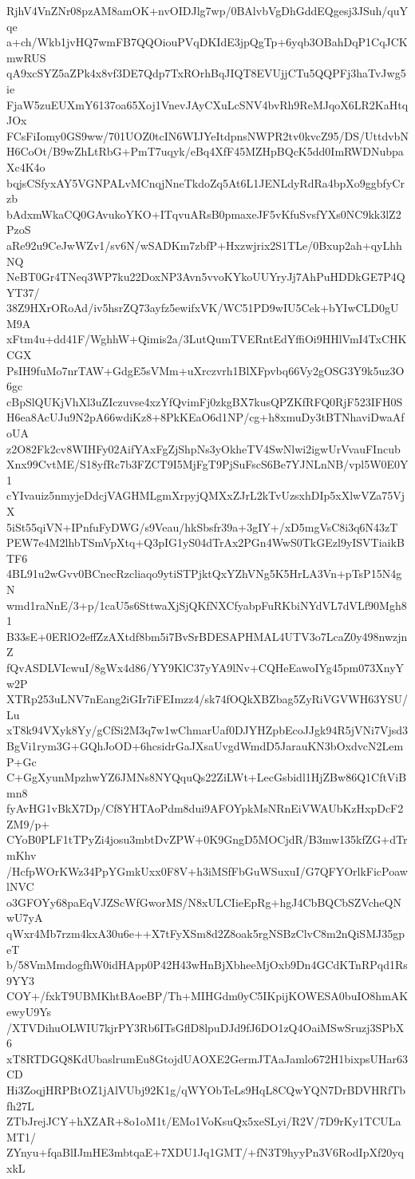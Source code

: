 RjhV4VnZNr08pzAM8amOK+nvOIDJlg7wp/0BAlvbVgDhGddEQgesj3JSuh/quYqe
a+ch/Wkb1jvHQ7wmFB7QQOiouPVqDKIdE3jpQgTp+6yqb3OBahDqP1CqJCKmwRUS
qA9xcSYZ5aZPk4x8vf3DE7Qdp7TxROrhBqJIQT8EVUjjCTu5QQPFj3haTvJwg5ie
FjaW5zuEUXmY6137oa65Xoj1VnevJAyCXuLcSNV4bvRh9ReMJqoX6LR2KaHtqJOx
FCsFiIomy0GS9ww/701UOZ0tcIN6WIJYeItdpnsNWPR2tv0kvcZ95/DS/UttdvbN
H6CoOt/B9wZhLtRbG+PmT7uqyk/eBq4XfF45MZHpBQcK5dd0ImRWDNubpaXc4K4o
bqjsCSfyxAY5VGNPALvMCnqjNneTkdoZq5At6L1JENLdyRdRa4bpXo9ggbfyCrzb
bAdxmWkaCQ0GAvukoYKO+ITqvuARsB0pmaxeJF5vKfuSvsfYXs0NC9kk3lZ2PzoS
aRe92u9CeJwWZv1/sv6N/wSADKm7zbfP+Hxzwjrix2S1TLe/0Bxup2ah+qyLhhNQ
NeBT0Gr4TNeq3WP7ku22DoxNP3Avn5vvoKYkoUUYryJj7AhPuHDDkGE7P4QYT37/
38Z9HXrORoAd/iv5hsrZQ73ayfz5ewifxVK/WC51PD9wIU5Cek+bYIwCLD0gUM9A
xFtm4u+dd41F/WghhW+Qimis2a/3LutQumTVERntEdYffiOi9HHlVmI4TxCHKCGX
PsIH9fuMo7nrTAW+GdgE5sVMm+uXrczvrh1BlXFpvbq66Vy2gOSG3Y9k5uz3O6gc
cBpSlQUKjVhXl3uZIczuvse4xzYfQvimFj0zkgBX7kusQPZKfRFQ0RjF523IFH0S
H6ea8AcUJu9N2pA66wdiKz8+8PkKEaO6d1NP/cg+h8xmuDy3tBTNhaviDwaAfoUA
z2O82Fk2cv8WIHFy02AifYAxFgZjShpNs3yOkheTV4SwNlwi2igwUrVvauFIncub
Xnx99CvtME/S18yfRc7b3FZCT9I5MjFgT9PjSuFscS6Be7YJNLnNB/vpl5W0E0Y1
cYIvauiz5nmyjeDdcjVAGHMLgmXrpyjQMXxZJrL2kTvUzsxhDIp5xXlwVZa75VjX
5iSt55qiVN+IPnfuFyDWG/s9Veau/hkSbsfr39a+3gIY+/xD5mgVsC8i3q6N43zT
PEW7e4M2lhbTSmVpXtq+Q3pIG1yS04dTrAx2PGn4WwS0TkGEzl9yISVTiaikBTF6
4BL91u2wGvv0BCnecRzcliaqo9ytiSTPjktQxYZhVNg5K5HrLA3Vn+pTsP15N4gN
wmd1raNnE/3+p/1caU5s6SttwaXjSjQKfNXCfyabpFuRKbiNYdVL7dVLf90Mgh81
B33sE+0ERlO2effZzAXtdf8bm5i7BvSrBDESAPHMAL4UTV3o7LcaZ0y498nwzjnZ
fQvASDLVIcwuI/8gWx4d86/YY9KlC37yYA9lNv+CQHeEawoIYg45pm073XnyYw2P
XTRp253uLNV7nEang2iGIr7iFEImzz4/sk74fOQkXBZbag5ZyRiVGVWH63YSU/Lu
xT8k94VXyk8Yy/gCfSi2M3q7w1wChmarUaf0DJYHZpbEcoJJgk94R5jVNi7Vjsd3
BgVi1rym3G+GQhJoOD+6hcsidrGaJXsaUvgdWmdD5JarauKN3bOxdvcN2LemP+Gc
C+GgXyunMpzhwYZ6JMNs8NYQquQs22ZiLWt+LecGsbidl1HjZBw86Q1CftViBmn8
fyAvHG1vBkX7Dp/Cf8YHTAoPdm8dui9AFOYpkMsNRnEiVWAUbKzHxpDcF2ZM9/p+
CYoB0PLF1tTPyZi4josu3mbtDvZPW+0K9GngD5MOCjdR/B3mw135kfZG+dTrmKhv
/HcfpWOrKWz34PpYGmkUxx0F8V+h3iMSfFbGuWSuxuI/G7QFYOrlkFicPoawlNVC
o3GFOYy68paEqVJZScWfGworMS/N8xULCIieEpRg+hgJ4CbBQCbSZVcheQNwU7yA
qWxr4Mb7rzm4kxA30u6e++X7tFyXSm8d2Z8oak5rgNSBzClvC8m2nQiSMJ35gpeT
b/58VmMmdogfhW0idHApp0P42H43wHnBjXbheeMjOxb9Dn4GCdKTnRPqd1Rs9YY3
COY+/fxkT9UBMKhtBAoeBP/Th+MIHGdm0yC5IKpijKOWESA0buIO8hmAKewyU9Ys
/XTVDihuOLWIU7kjrPY3Rb6ITsGflD8lpuDJd9fJ6DO1zQ4OaiMSwSruzj3SPbX6
xT8RTDGQ8KdUbaslrumEu8GtojdUAOXE2GermJTAaJamlo672H1bixpsUHar63CD
Hi3ZoqjHRPBtOZ1jAlVUbj92K1g/qWYObTeLs9HqL8CQwYQN7DrBDVHRfTbfh27L
ZTbJrejJCY+hXZAR+8o1oM1t/EMo1VoKsuQx5xeSLyi/R2V/7D9rKy1TCULaMT1/
ZYnyu+fqaBlIJmHE3mbtqaE+7XDU1Jq1GMT/+fN3T9hyyPn3V6RodIpXf20yqxkL

